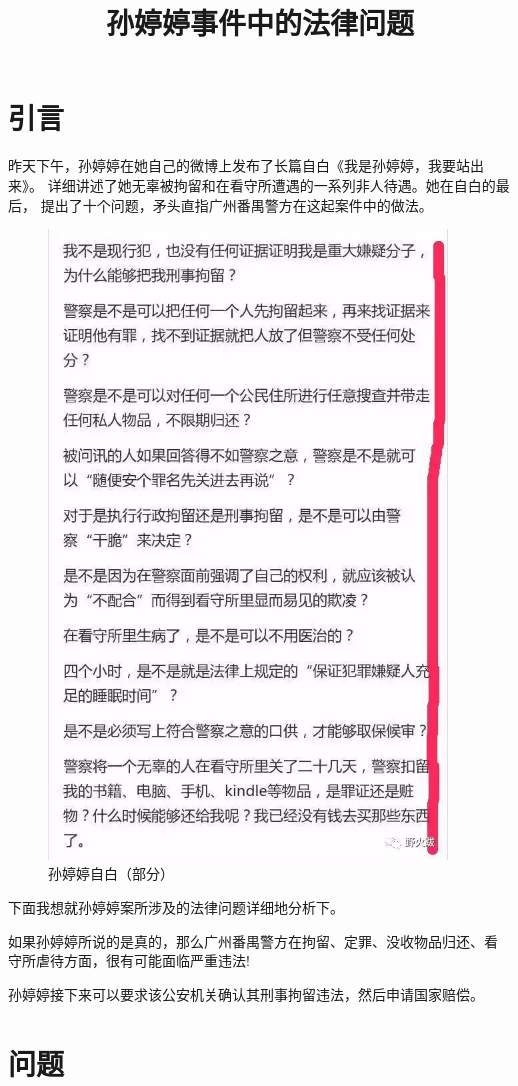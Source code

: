 \documentclass{ctexart}
\title{孙婷婷事件中的法律问题}
\begin{document}
\maketitle
\tableofcontents
\section{引言}
昨天下午，孙婷婷在她自己的微博上发布了长篇自白《我是孙婷婷，我要站出来》。 详细讲述了她无辜被拘留和在看守所遭遇的一系列非人待遇。她在自白的最后， 提出了十个问题，矛头直指广州番禺警方在这起案件中的做法。
\begin{figure}
  \centering
  \includegraphics[width=300pt]{page1image.jpg}
  \caption{孙婷婷自白（部分）}
\end{figure}
下面我想就孙婷婷案所涉及的法律问题详细地分析下。 \par
如果孙婷婷所说的是真的，那么广州番禺警方在拘留、定罪、没收物品归还、看
守所虐待方面，很有可能面临严重违法!
\par
孙婷婷接下来可以要求该公安机关确认其刑事拘留违法，然后申请国家赔偿。
\section{问题}
\end{document}
